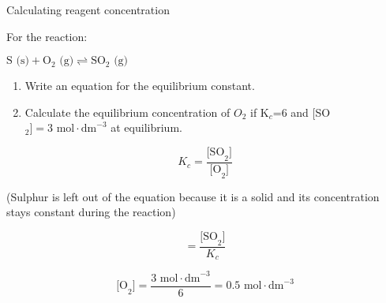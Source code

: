 \begin{wex}{Calculating reagent concentration}{For the reaction:
\begin{center}
$\text{S (s)} + \text{O}_{2}\text{ (g)} \rightleftharpoons \text{SO}_{2}\text{ (g)}$
\end{center}

\begin{enumerate}
\item{Write an equation for the equilibrium constant.}
\item{Calculate the equilibrium concentration of $O_{2}$ if K$_{c}$=6 and
  [SO$_{2}]=3 \text{ mol} \cdot \text{dm}^{-3}$ at equilibrium.}   
\end{enumerate} }
{

\begin{equation*}
K_{c} = \frac{\text{[SO}_{2}\text{]}}{\text{[O}_{2}\text{]}}
\end{equation*}

(Sulphur is left out of the equation because it is a solid and its concentration stays constant during the reaction)\\

\begin{equation*}
[O_{2}] = \frac{\text{[SO}_{2}\text{]}}{K_{c}}
\end{equation*}

\begin{equation*}
\text{[O}_{2}\text{]} = \frac{3 \text{ mol} \cdot \text{dm}^{-3}}{6} = 0.5 \text{ mol} \cdot \text{dm}^{-3}
\end{equation*}
}
\end{wex}  

